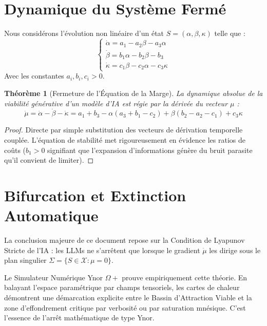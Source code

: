 \documentclass[11pt,a4paper]{article}
\newtheorem{theorem}{Théorème}
\begin{document}
\section{Dynamique du Système Fermé}
Nous considérons l'évolution non linéaire d'un état $S = (\alpha, \beta, \kappa)$ telle que :
\begin{equation}
 \begin{cases}
 \dot\alpha = a_1 - a_2\beta - a_3\alpha \\
 \dot\beta = b_1\alpha - b_2\beta - b_3 \\
 \dot\kappa = c_1\beta - c_2\alpha - c_3\kappa
 \end{cases}
\end{equation}
Avec les constantes $a_i, b_i, c_i > 0$.

\begin{theorem}[Fermeture de l'Équation de la Marge]
La dynamique absolue de la viabilité générative d'un modèle d'IA est régie par la dérivée du vecteur $\mu$ :
\begin{equation}
 \dot\mu = \dot\alpha - \dot\beta - \dot\kappa = a_1+b_3 - \alpha(a_3+b_1-c_2) + \beta(b_2-a_2-c_1) + c_3\kappa
\end{equation}
\end{theorem}
\begin{proof}
Directe par simple substitution des vecteurs de dérivation temporelle couplée. L'équation de stabilité met rigoureusement en évidence les ratios de coûts ($b_1 > 0$ signifiant que l'expansion d'informations génère du bruit parasite qu'il convient de limiter).
\end{proof}

\section{Bifurcation et Extinction Automatique}
La conclusion majeure de ce document repose sur la Condition de Lyapunov Stricte de l'IA : les LLMs ne s'arrêtent que lorsque le gradient $\dot\mu$ les dirige sous le plan singulier $\Sigma = \{S \in \mathcal{X} : \mu = 0\}$.

Le Simulateur Numérique Ynor $\Omega+$ prouve empiriquement cette théorie. En balayant l'espace paramétrique par champs tensoriels, les cartes de chaleur démontrent une démarcation explicite entre le Bassin d'Attraction Viable et la zone d'effondrement critique par verbosité ou par saturation mnésique. C'est l'essence de l'arrêt mathématique de type Ynor.
\end{document}
